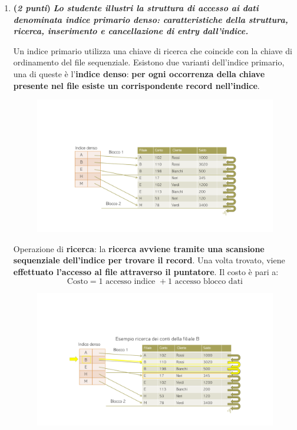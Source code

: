 \documentclass[a4paper]{article}
\begin{document}
\begin{enumerate}
		\item \textbf{(\emph{2 punti})} \textcolor{Green4}{\textbf{\emph{Lo studente illustri la struttura di accesso ai dati denominata indice primario denso: caratteristiche della struttura, ricerca, inserimento e cancellazione di entry dall'indice.}}}\label{dom: indice primario denso}
		
		Un indice primario utilizza una chiave di ricerca che coincide con la chiave di ordinamento del file sequenziale. Esistono due varianti dell'indice primario, una di queste è l'\textbf{indice denso}: \textbf{per ogni occorrenza della chiave presente nel file esiste un corrispondente record nell'indice}.
		\begin{figure}[!htp]
			\centering
			\includegraphics[width=.9\textwidth]{img/ex/indice-denso-1.pdf}
		\end{figure}
		
		\noindent
		Operazione di \textbf{ricerca}: la \textbf{ricerca avviene tramite una scansione sequenziale dell'indice per trovare il record}. Una volta trovato, viene \textbf{effettuato l'accesso al file attraverso il puntatore}. Il costo è pari a:
		\begin{equation*}
			\text{Costo} = 1 \text{ accesso indice } + 1 \text{ accesso blocco dati}
		\end{equation*}
		\begin{figure}[!htp]
			\centering
			\includegraphics[width=.9\textwidth]{img/ex/indice-denso-2.pdf}
		\end{figure}
		

\end{enumerate}
\end{document}
